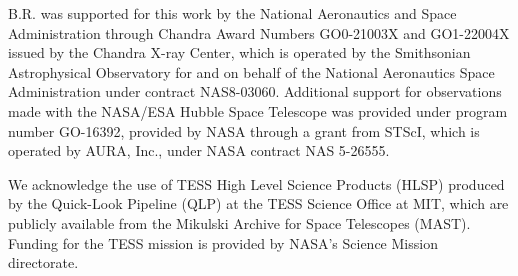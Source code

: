 \documentclass[twocolumn, tighten, times, astrosymb]{aastex631}
\begin{document}
\begin{acknowledgments}
B.R. was supported for this work  by the National Aeronautics and Space Administration through Chandra Award Numbers GO0-21003X and GO1-22004X issued by the Chandra X-ray Center, which is operated by the Smithsonian Astrophysical Observatory for and on behalf of the National Aeronautics Space Administration under contract NAS8-03060.  Additional support for observations made with the NASA/ESA Hubble Space Telescope was provided under program number GO-16392, provided by NASA through a grant from STScI, which is operated by AURA, Inc., under NASA contract NAS 5-26555. 
\end{acknowledgments}
\begin{acknowledgments}
We acknowledge the use of TESS High Level Science Products (HLSP) produced by the Quick-Look Pipeline (QLP) at the TESS Science Office at MIT, which are publicly available from the Mikulski Archive for Space Telescopes (MAST). Funding for the TESS mission is provided by NASA's Science Mission directorate.
\end{acknowledgments}
\end{document}
